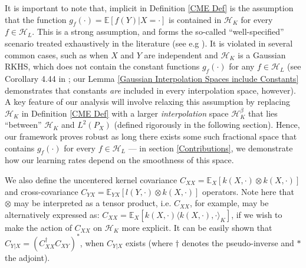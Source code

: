 \documentclass[accepted]{article}
\theoremstyle{definition}
\begin{document}
\par It is important to note that, implicit in Definition \ref{CME Def} is the assumption that the function $g_f(\cdot) = \mathbb{E}[f(Y) | X = \cdot]$ is contained in $\mathcal{H}_K$ for every $f \in \mathcal{H}_L$. This is a strong assumption, and forms the so-called ``well-specified'' scenario treated exhaustively in the literature (see e.g \cite{song2009hilbert,song2010nonparametric}). It is violated in several common cases, such as when $X$ and $Y$ are independent and $\mathcal{H}_K$ is a Gaussian RKHS, which does not contain the constant functions $g_f(\cdot)$ for any $f \in \mathcal{H}_L$ (see Corollary 4.44 in \cite{steinwart2008support}; our Lemma \ref{Gaussian Interpolation Spaces include Constants} demonstrates that constants \textit{are} included in every interpolation space, however). A key feature of our analysis will involve relaxing this assumption by replacing $\mathcal{H}_K$ in Definition \ref{CME Def} with a larger \textit{interpolation} space $\mathcal{H}^{\beta}_K$ that lies ``between'' $\mathcal{H}_K$ and $L^2(P_X)$ (defined rigorously in the following section). Hence, our framework proves robust as long there exists some such fractional space that contains $g_f(\cdot)$ for every $f \in \mathcal{H}_L$ --- in section \ref{Contributions}, we demonstrate how our learning rates depend on the smoothness of this space.


\par We also define the uncentered kernel covariance $C_{XX} = \mathbb{E}_{X}[k(X, \cdot) \otimes k(X,  \cdot)]$ and cross-covariance  $C_{YX} = \mathbb{E}_{YX}[l(Y, \cdot) \otimes k(X,  \cdot)]$ operators. Note here that $\otimes$ may be interpreted as a tensor product, i.e. $C_{XX}$, for example, may be alternatively expressed as: $C_{XX} = \mathbb{E}_{X}[k(X, \cdot)\langle k(X, \cdot), \cdot \rangle_{K}]$, if we wish to make the action of $C_{XX}$ on $\mathcal{H}_K$ more explicit. It can be easily shown \citep{klebanov2020rigorous} that $C_{Y|X} = (C^{\dagger}_{XX}C_{XY})^{*}$, when $C_{Y|X}$ exists (where $\dagger$ denotes the pseudo-inverse and $*$ the adjoint). 
\end{document}
